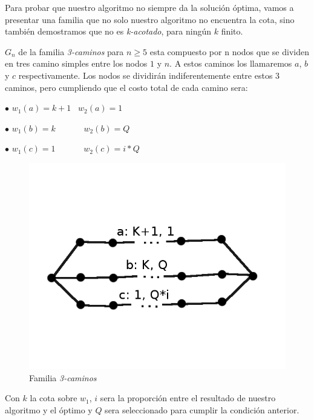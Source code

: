 Para probar que nuestro algoritmo no siempre da la solución óptima, vamos a presentar una familia que no solo nuestro algoritmo no encuentra la cota, sino también demostramos que no es \emph{k-acotado}, para ningún $k$ finito.


$G_n$ de la familia \emph{3-caminos} para $n \geq 5$ esta compuesto por n nodos que se dividen en tres camino simples entre los nodos $1$ y $n$. A estos caminos los llamaremos $a$, $b$ y $c$ respectivamente. Los nodos se dividirán indiferentemente entre estos 3 caminos, pero cumpliendo que el costo total de cada camino sera:

$\bullet$ $w_1(a) = k+1$ \ $w_2(a)=1$

$\bullet$ $w_1(b) = k$  \ \ \ \ \ \ $w_2(b)=Q$

$\bullet$ $w_1(c) = 1$ \ \ \ \ \ \   $w_2(c)=i*Q$


\begin{figure}[H]
  \begin{center}
  \begin{minipage}{0.5\linewidth}
    \includegraphics[width=\linewidth]{graficos/grafoFamiliaRompe.png}
    \caption{Familia \emph{3-caminos}}\label{fig:familia1}
  \end{minipage}
  \end{center}
\end{figure}

Con $k$ la cota sobre $w_1$, $i$ sera la proporción entre el resultado de nuestro algoritmo y el óptimo y $Q$ sera seleccionado para cumplir la condición anterior.

